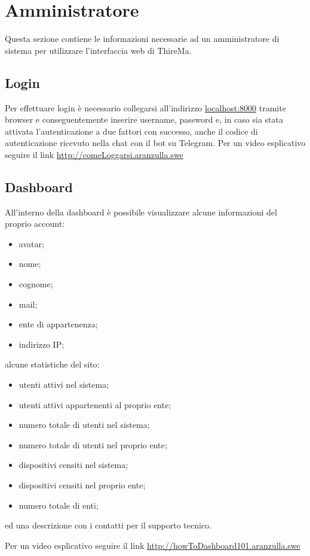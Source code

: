 \section{Amministratore}
Questa sezione contiene le informazioni necessarie ad un amministratore di sistema per utilizzare l'interfaccia web di ThireMa.

\subsection{Login}
Per effettuare login è necessario collegarsi all'indirizzo \url{localhost:8000} tramite browser e conseguentemente inserire username, password e, in caso sia stata attivata l'autenticazione a due fattori con successo, anche il codice di autenticazione ricevuto nella chat con il bot su Telegram.
Per un video esplicativo seguire il link \url{http://comeLoggarsi.aranzulla.swe}

\subsection{Dashboard}
All'interno della dashboard è possibile visualizzare alcune informazioni del proprio account:
\begin{itemize}
	\item avatar;
	\item nome;
	\item cognome;
	\item mail;
	\item ente di appartenenza;
	\item indirizzo IP;
\end{itemize}

alcune statistiche del sito:
\begin{itemize}
	\item utenti attivi nel sistema;
	\item utenti attivi appartenenti al proprio ente;
	\item numero totale di utenti nel sistema;
	\item numero totale di utenti nel proprio ente;
	\item dispositivi censiti nel sistema;
	\item dispositivi censiti nel proprio ente;
	\item numero totale di enti;
\end{itemize}

ed una descrizione con i contatti per il supporto tecnico.

Per un video esplicativo seguire il link \url{http://howToDashboard101.aranzulla.swe}